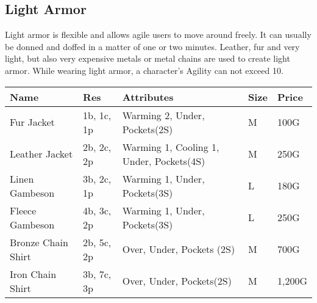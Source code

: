 \subsection{Light Armor}\label{subsec:lightArmor}
Light armor is flexible and allows agile users to move around freely.
It can usually be donned and doffed in a matter of one or two minutes.
Leather, fur and very light, but also very expensive metals or metal chains are used to create light armor.
While wearing light armor, a character's Agility can not exceed 10.

\begin{longtable}{p{3.5cm} | p{1.5cm} | p{5cm} | p{1cm} | p{1.25cm}}
	Name & Res &  Attributes & Size & Price\\ \hline
	Fur Jacket & 1b, 1c, 1p & Warming 2, Under, Pockets(2S) & M & 100G\\

	Leather Jacket & 2b, 2c, 2p & Warming 1, Cooling 1, Under, Pockets(4S)  & M & 250G\\

	Linen Gambeson & 3b, 2c, 1p & Warming 1, Under, Pockets(3S) & L & 180G\\

	Fleece Gambeson & 4b, 3c, 2p & Warming 1, Under, Pockets(3S) & L & 250G\\

	Bronze Chain Shirt & 2b, 5c, 2p & Over, Under, Pockets (2S) & M & 700G\\

	Iron Chain Shirt & 3b, 7c, 3p & Over, Under, Pockets(2S) & M & 1,200G\\
\end{longtable}